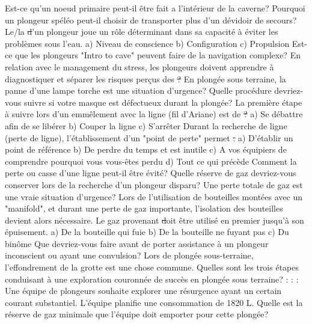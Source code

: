\documentclass[english,10pt,a4paper]{article}
\begin{document}
\begin{outline}
		\1 Est-ce qu’un noeud primaire peut-il être fait a l’intérieur de la caverne?
			\vspace{2cm}
		\1 Pourquoi un plongeur spéléo peut-il choisir de transporter plus d’un dévidoir de secours?
			\vspace{2cm}
		\1 Le/la \st d’un plongeur joue un rôle déterminant dans sa capacité à éviter les problèmes sous l’eau.
			\2 a)	Niveau de conscience
			\2 b)	Configuration
			\2 c)	Propulsion
		\1 Est-ce que les plongeurs "Intro to cave" peuvent faire de la navigation complexe?
			\vf
		\1 En relation avec le management du stress, les plongeurs doivent apprendre à diagnostiquer et séparer les risques perçus des \st?
			\2
		\1 En plongée sous terraine, la panne d’une lampe torche est une situation d’urgence?
			\vf
		\1 Quelle procédure devriez-vous suivre si votre masque est défectueux durant la plongée?
			\vspace{2cm}
		\1 La première étape à suivre lors d’un emmêlement avec la ligne (fil d’Ariane) est de \st?
			\2 a)	Se débattre afin de se libérer
			\2 b)	Couper la ligne
			\2 c)	S’arrêter
		\1 Durant la recherche de ligne (perte de ligne), l’établissement d’un "point de perte" permet \st.
			\2 a)	D’établir un point de référence
			\2 b)	De perdre du temps et est inutile
			\2 c)	A vos équipiers de comprendre pourquoi vous vous-êtes perdu
			\2 d)	Tout ce qui précède
		\1 Comment la perte ou casse d’une ligne peut-il être évité?
			\vspace{2cm}
		\1 Quelle réserve de gaz devriez-vous conserver lors de la recherche d’un plongeur disparu?
			\vspace{2cm}
		\1 Une perte totale de gaz est une vraie situation d’urgence?
			\vf
		\1 Lors de l’utilisation de bouteilles montées avec un "manifold", et durant une perte de gaz importante, l’isolation des bouteilles devient alors nécessaire. Le gaz provenant \st doit être utilisé en 		premier jusqu’à son épuisement.
			\2 a)	De la bouteille qui fuie
			\2 b)	De la bouteille ne fuyant pas
			\2 c)	Du binôme
		\1 Que devriez-vous faire avant de porter assistance à un plongeur inconscient ou ayant une convulsion?
			\vspace{2cm}
		\1 Lors de plongée sous-terraine, l’effondrement de la grotte est une chose commune.
			\vf
		\1 Quelles sont les trois étapes conduisant à une exploration couronnée de succès en plongée sous terraine?
			:
			:
			:
		\1 Une équipe de plongeurs souhaite explorer une résurgence ayant un certain courant substantiel. L’équipe planifie une consommation de 1820 L. Quelle est la réserve de gaz minimale que l’équipe doit 		emporter pour cette plongée?

\end{outline}
\end{document}
